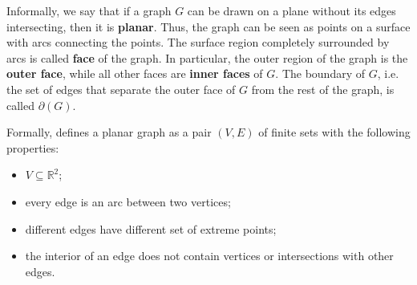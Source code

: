 Informally, we say that if a graph \(G\) can be drawn on a plane without its edges intersecting, then it is \textbf{planar}. Thus, the graph can be seen as points on a surface with arcs connecting the points. The surface region completely surrounded by arcs is called \textbf{face} of the graph. In particular, the outer region of the graph is the \textbf{outer face}, while all other faces are \textbf{inner faces} of \(G\). The boundary of \(G\), i.e. the set of edges that separate the outer face of \(G\) from the rest of the graph, is called \(\partial(G)\).


Formally, \cite{Diestel} defines a planar graph as a pair \((V, E)\) of finite sets with the following properties:

\begin{itemize}
    \item \(V \subseteq \mathbb{R}^2\);
    \item every edge is an arc between two vertices;
    \item different edges have different set of extreme points;
    \item the interior of an edge does not contain vertices or intersections with other edges.
\end{itemize}



